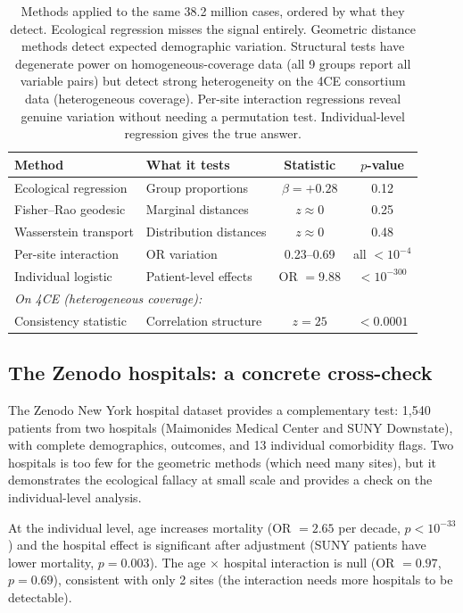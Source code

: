 \documentclass{article}
\begin{document}
\begin{table}[t]
\centering
\caption{Methods applied to the same 38.2 million cases, ordered by what
they detect.  Ecological regression misses the signal entirely.  Geometric
distance methods detect expected demographic variation.  Structural tests
have degenerate power on homogeneous-coverage data (all 9 groups report all
variable pairs) but detect strong heterogeneity on the 4CE consortium data
(heterogeneous coverage).  Per-site interaction regressions reveal genuine
variation without needing a permutation test.  Individual-level regression
gives the true answer.}
\label{tab:comparison}
\begin{tabular}{llcc}
\toprule
Method & What it tests & Statistic & $p$-value \\
\midrule
Ecological regression & Group proportions & $\beta = +0.28$ & 0.12 \\
Fisher--Rao geodesic & Marginal distances & $z \approx 0$ & 0.25 \\
Wasserstein transport & Distribution distances & $z \approx 0$ & 0.48 \\
Per-site interaction & OR variation & 0.23--0.69 & all $< 10^{-4}$ \\
Individual logistic & Patient-level effects & OR $= 9.88$ & $< 10^{-300}$ \\
\midrule
\multicolumn{4}{l}{\emph{On 4CE (heterogeneous coverage):}} \\
Consistency statistic & Correlation structure & $z = 25$ & $< 0.0001$ \\
\bottomrule
\end{tabular}
\end{table}


\subsection{The Zenodo hospitals: a concrete cross-check}

The Zenodo New York hospital dataset provides a complementary test: 1,540
patients from two hospitals (Maimonides Medical Center and SUNY Downstate),
with complete demographics, outcomes, and 13 individual comorbidity flags.
Two hospitals is too few for the geometric methods (which need many sites), but
it demonstrates the ecological fallacy at small scale and provides a check on
the individual-level analysis.

At the individual level, age increases mortality (OR $= 2.65$ per decade,
$p < 10^{-33}$) and the hospital effect is significant after adjustment
(SUNY patients have lower mortality, $p = 0.003$).  The age $\times$ hospital
interaction is null (OR $= 0.97$, $p = 0.69$), consistent with only 2
sites (the interaction needs more hospitals to be detectable).
\end{document}

